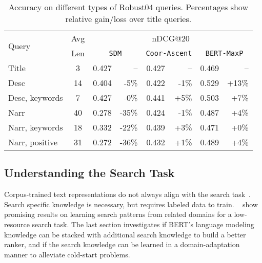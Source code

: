 \documentclass[sigconf]{acmart}
\begin{document}
\begin{table}[tb]
 \centering
\caption{Accuracy on different types of Robust04 queries. Percentages show relative gain/loss over title queries.}\label{tab:query-types}
\def\arraystretch{0.9}
\vspace{-0.15in}
\setlength\tabcolsep{3pt}

\begin{tabular}{l|c|cr|cr|cr}
\hline \hline
\multirow{2}{*}{Query} & Avg & \multicolumn{6}{c}{nDCG@20} \\ 
  & Len & \multicolumn{2}{c}{\texttt{SDM}}   & \multicolumn{2}{c}{\texttt{Coor-Ascent}}  & \multicolumn{2}{c}{\texttt{BERT-MaxP}} \\ \hline
 






Title                   & 3   & 0.427   & -- & 0.427 & -- & 0.469    & -- \\    \hline
Desc        & 14  & 0.404   & -5\%   & 0.422  & -1\% & 0.529    & +13\% \\ 

Desc, keywords   & 7  & 0.427   & -0\%  & 0.441  & +5\%& 0.503     & +7\% \\  \hline

Narr          & 40   &  0.278  &  -35\%   & 0.424 & -1\% & 0.487  & +4\%  \\
Narr, keywords     &  18 &  0.332  & -22\%   & 0.439  & +3\%&    0.471 &  +0\%  \\ 
Narr, positive          & 31   & 0.272   &  -36\%    & 0.432 & +1\% & 0.489   & +4\%  \\

\hline \hline
\end{tabular}
\end{table}
 
\subsection{Understanding the Search Task}

Corpus-trained text representations do not always align with the search task~\cite{K-NRM}. Search specific knowledge is necessary, but requires labeled data to train.  ~\citet{dai2018convolutional} show promising results on learning search patterns from related domains for a low-resource search task. The last section investigates if BERT's language modeling knowledge can be stacked with additional search knowledge to build a better ranker, and if the search knowledge can be learned in a domain-adaptation manner to alleviate cold-start problems. 
\end{document}
